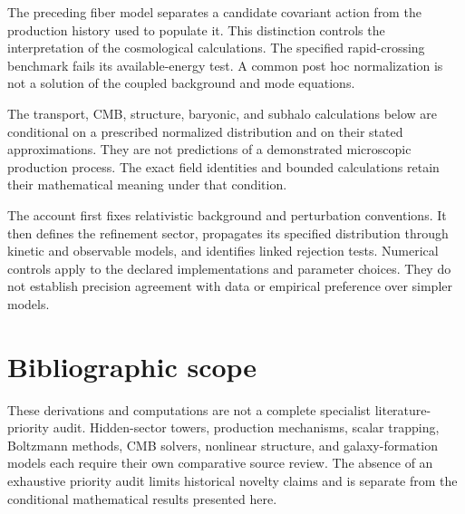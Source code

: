 \documentclass[11pt,twoside,openany]{book}
\theoremstyle{definition}
\theoremstyle{remark}
\begin{document}
\mainmatter
{}
The preceding fiber model separates a candidate covariant action from the production history used to populate it. This distinction controls the interpretation of the cosmological calculations. The specified rapid-crossing benchmark fails its available-energy test. A common post hoc normalization is not a solution of the coupled background and mode equations.

\begin{monographnote}
The transport, CMB, structure, baryonic, and subhalo calculations below are conditional on a prescribed normalized distribution and on their stated approximations. They are not predictions of a demonstrated microscopic production process. The exact field identities and bounded calculations retain their mathematical meaning under that condition.
\end{monographnote}
The account first fixes relativistic background and perturbation conventions. It then defines the refinement sector, propagates its specified distribution through kinetic and observable models, and identifies linked rejection tests. Numerical controls apply to the declared implementations and parameter choices. They do not establish precision agreement with data or empirical preference over simpler models.






\appendix
\section*{Bibliographic scope}
These derivations and computations are not a complete specialist literature-priority audit. Hidden-sector towers, production mechanisms, scalar trapping, Boltzmann methods, CMB solvers, nonlinear structure, and galaxy-formation models each require their own comparative source review. The absence of an exhaustive priority audit limits historical novelty claims and is separate from the conditional mathematical results presented here.
\end{document}
